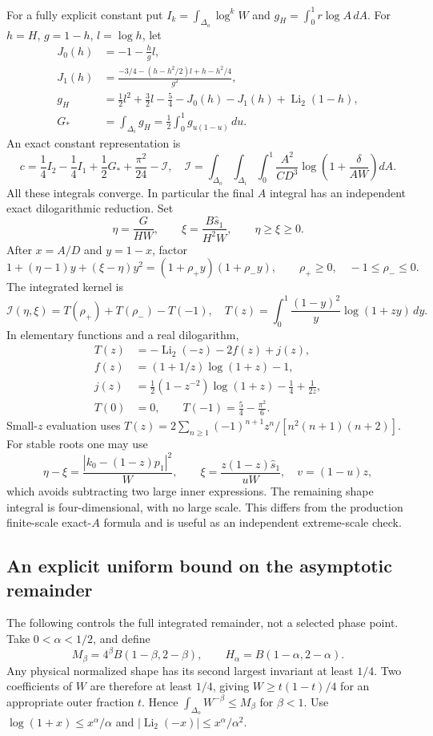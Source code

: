 For a fully explicit constant put $I_k=\int_{\Delta_o}\log^kW$ and
$g_H=\int_0^1r\log A\,dA$. For $h=H$, $g=1-h$, $l=\log h$, let
\begin{align*}
 J_0(h)&=-1-\frac{h}{g}l,\\
 J_1(h)&=\frac{-3/4-(h-h^2/2)l+h-h^2/4}{g^2},\\
 g_H&=\frac12l^2+\frac32l-\frac54-J_0(h)-J_1(h)
                    +\operatorname{Li}_2(1-h),\\
 G_*&=\int_{\Delta_i}g_H
     =\frac12\int_0^1g_{u(1-u)}\,du.
\end{align*}
An exact constant representation is
\[
 c=\frac14I_2-\frac14I_1+\frac12G_*+\frac{\pi^2}{24}-\mathcal I,
\quad
 \mathcal I=\int_{\Delta_o}\int_{\Delta_i}\int_0^1
   \frac{A^2}{CD^3}\log\left(1+\frac\delta{AW}\right)dA.
\]
All these integrals converge. In particular the final $A$ integral has an
independent exact dilogarithmic reduction. Set
\[
 \eta=\frac{G}{HW},\qquad \xi=\frac{B\widehat s_1}{H^2W},
 \qquad \eta\ge\xi\ge0.
\]
After $x=A/D$ and $y=1-x$, factor
\[
 1+(\eta-1)y+(\xi-\eta)y^2=(1+\rho_+y)(1+\rho_-y),
 \qquad \rho_+\ge0,\quad -1\le\rho_-\le0.
\]
The integrated kernel is
\[
 \mathcal I(\eta,\xi)=T(\rho_+)+T(\rho_-)-T(-1),
 \quad
 T(z)=\int_0^1\frac{(1-y)^2}{y}\log(1+zy)\,dy.
\]
In elementary functions and a real dilogarithm,
\begin{align*}
 T(z)&=-\operatorname{Li}_2(-z)-2f(z)+j(z),\\
 f(z)&=(1+1/z)\log(1+z)-1,\\
 j(z)&=\tfrac12(1-z^{-2})\log(1+z)-\tfrac14+\tfrac1{2z},\\
 T(0)&=0,\qquad T(-1)=\tfrac54-\tfrac{\pi^2}{6}.
\end{align*}
Small-$z$ evaluation uses
$T(z)=2\sum_{n\ge1}(-1)^{n+1}z^n/[n^2(n+1)(n+2)]$.
For stable roots one may use
\[
 \eta-\xi=\frac{|k_0-(1-z)p_1|^2}{W},\qquad
 \xi=\frac{z(1-z)\widehat s_1}{uW},\quad
 v=(1-u)z,
\]
which avoids subtracting two large inner expressions. The remaining shape
integral is four-dimensional, with no large scale. This differs from the
production finite-scale exact-$A$ formula and is useful as an independent
extreme-scale check.

\subsection{An explicit uniform bound on the asymptotic remainder}

The following controls the full integrated remainder, not a selected phase
point. Take $0<\alpha<1/2$, and define
\[
 M_\beta=4^\beta B(1-\beta,2-\beta),\qquad
 H_\alpha=B(1-\alpha,2-\alpha).
\]
Any physical normalized shape has its second largest invariant at least
$1/4$. Two coefficients of $W$ are therefore at least $1/4$, giving
$W\ge t(1-t)/4$ for an appropriate outer fraction $t$. Hence
$\int_{\Delta_o}W^{-\beta}\le M_\beta$ for $\beta<1$.
Use $\log(1+x)\le x^\alpha/\alpha$ and
$|\operatorname{Li}_2(-x)|\le x^\alpha/\alpha^2$.

